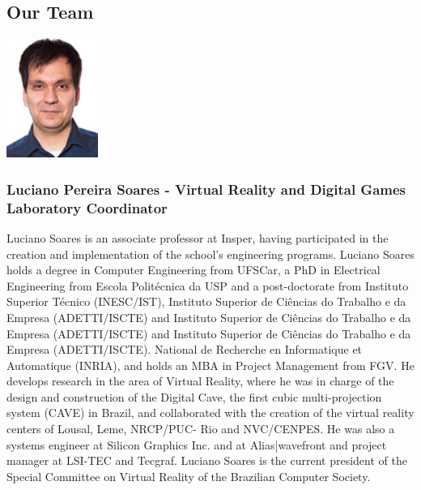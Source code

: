 \subsection{Our Team}
\setlength{\columnsep}{-10cm}
\begin{multicols}{2}
\includegraphics[width=3cm]{imgs/luciano-soares.jpg}
\columnbreak
\subsubsection{Luciano Pereira Soares - Virtual Reality and Digital Games Laboratory Coordinator}
Luciano Soares is an associate professor at Insper, having participated in the creation and implementation of the school's engineering programs. Luciano Soares holds a degree in Computer Engineering from UFSCar, a PhD in Electrical Engineering from Escola Politécnica da USP and a post-doctorate from Instituto Superior Técnico (INESC/IST), Instituto Superior de Ciências do Trabalho e da Empresa (ADETTI/ISCTE) and Instituto Superior de Ciências do Trabalho e da Empresa (ADETTI/ISCTE) and Instituto Superior de Ciências do Trabalho e da Empresa (ADETTI/ISCTE). National de Recherche en Informatique et Automatique (INRIA), and holds an MBA in Project Management from FGV. He develops research in the area of Virtual Reality, where he was in charge of the design and construction of the Digital Cave, the first cubic multi-projection system (CAVE) in Brazil, and collaborated with the creation of the virtual reality centers of Lousal, Leme, NRCP/PUC- Rio and NVC/CENPES. He was also a systems engineer at Silicon Graphics Inc. and at Alias|wavefront and project manager at LSI-TEC and Tecgraf. Luciano Soares is the current president of the Special Committee on Virtual Reality of the Brazilian Computer Society.
\end{multicols}


